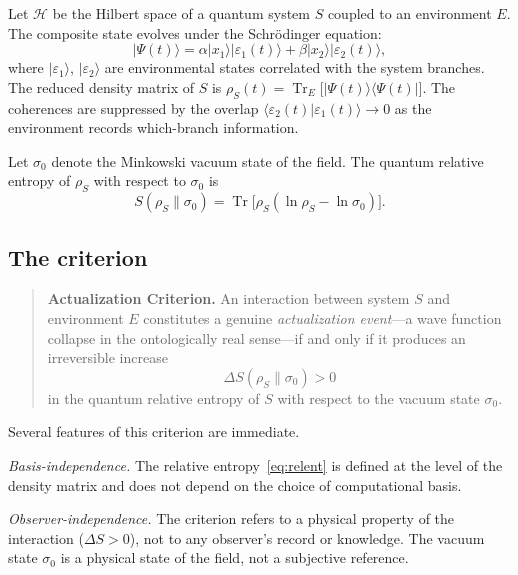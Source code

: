 \documentclass[11pt,twocolumn]{article}
\newcommand{\ket}[1]{|#1\rangle}
\newcommand{\bra}[1]{\langle #1|}
\newcommand{\braket}[2]{\langle #1|#2\rangle}
\newcommand{\rhoS}{\rho_S}
\begin{document}
Let $\mathcal{H}$ be the Hilbert space of a quantum system $S$
coupled to an environment $E$. The composite state evolves under
the Schr\"odinger equation:
\begin{equation}
  \ket{\Psi(t)} = \alpha\ket{x_1}\ket{\varepsilon_1(t)}
                + \beta\ket{x_2}\ket{\varepsilon_2(t)},
  \label{eq:composite}
\end{equation}
where $\ket{\varepsilon_1}$, $\ket{\varepsilon_2}$ are environmental
states correlated with the system branches.
The reduced density matrix of $S$ is
$\rhoS(t) = \operatorname{Tr}_E\bigl[\ket{\Psi(t)}\bra{\Psi(t)}\bigr]$.
The coherences are suppressed by the overlap
$\braket{\varepsilon_2(t)}{\varepsilon_1(t)} \to 0$
as the environment records which-branch information.

Let $\sigma_0$ denote the Minkowski vacuum state of the field.
The quantum relative entropy of $\rhoS$ with respect to $\sigma_0$
is~\cite{Umegaki1962,Lindblad1975}
\begin{equation}
  S(\rhoS\|\sigma_0)
  = \operatorname{Tr}\bigl[\rhoS(\ln \rhoS - \ln \sigma_0)\bigr].
  \label{eq:relent}
\end{equation}

\subsection{The criterion}
\label{sec:criterion_statement}

\begin{quote}
\textbf{Actualization Criterion.}
An interaction between system $S$ and environment $E$ constitutes
a genuine \emph{actualization event}---a wave function collapse in
the ontologically real sense---if and only if it produces an
irreversible increase
\begin{equation}
  \Delta S(\rhoS\|\sigma_0) > 0
  \label{eq:criterion}
\end{equation}
in the quantum relative entropy of $S$ with respect to the
vacuum state $\sigma_0$.
\end{quote}

Several features of this criterion are immediate.

\emph{Basis-independence.}
The relative entropy~\eqref{eq:relent} is defined at the level
of the density matrix and does not depend on the choice of
computational basis.

\emph{Observer-independence.}
The criterion refers to a physical property of the interaction
($\Delta S > 0$), not to any observer's record or knowledge.
The vacuum state $\sigma_0$ is a physical state of the field,
not a subjective reference.
\end{document}
